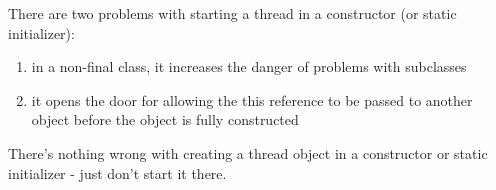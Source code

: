 There are two problems with starting a thread in a constructor (or static initializer):

\begin{enumerate}
    \item in a non-final class, it increases the danger of problems with subclasses
    \item it opens the door for allowing the this reference to be passed to another object before the object is fully constructed
\end{enumerate}
    

There's nothing wrong with creating a thread object in a constructor or static initializer - just don't start it there.